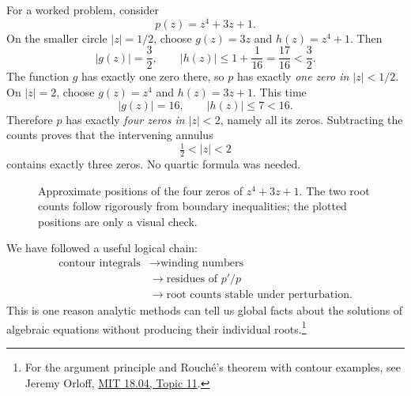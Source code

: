 For a worked problem, consider
\[
 p(z)=z^4+3z+1.
\]
On the smaller circle $|z|=1/2$, choose $g(z)=3z$ and $h(z)=z^4+1$. Then
\[
 |g(z)|=\frac32,\qquad
 |h(z)|\le1+\frac1{16}=\frac{17}{16}<\frac32.
\]
The function $g$ has exactly one zero there, so $p$ has exactly \emph{one zero in $|z|<1/2$}. On $|z|=2$, choose $g(z)=z^4$ and $h(z)=3z+1$. This time
\[
 |g(z)|=16,\qquad |h(z)|\le7<16.
\]
Therefore $p$ has exactly \emph{four zeros in $|z|<2$}, namely all its zeros. Subtracting the counts proves that the intervening annulus
\[
 \boxed{\tfrac12<|z|<2}
\]
contains exactly three zeros. No quartic formula was needed.

\begin{figure}[H]
\centering
{}
\caption{Approximate positions of the four zeros of $z^4+3z+1$. The two root counts follow rigorously from boundary inequalities; the plotted positions are only a visual check.}
\end{figure}

We have followed a useful logical chain:
\[
 \begin{aligned}
 \text{contour integrals}
 &\longrightarrow\text{winding numbers}\\
 &\longrightarrow\text{residues of }p'/p\\
 &\longrightarrow\text{root counts stable under perturbation}.
 \end{aligned}
\]
This is one reason analytic methods can tell us global facts about the solutions of algebraic equations without producing their individual roots.\footnote{For the argument principle and Rouch\'e's theorem with contour examples, see Jeremy Orloff, \href{https://ocw.mit.edu/courses/18-04-complex-variables-with-applications-spring-2018/resources/mit18_04s18_topic11/}{MIT 18.04, Topic 11}.}
